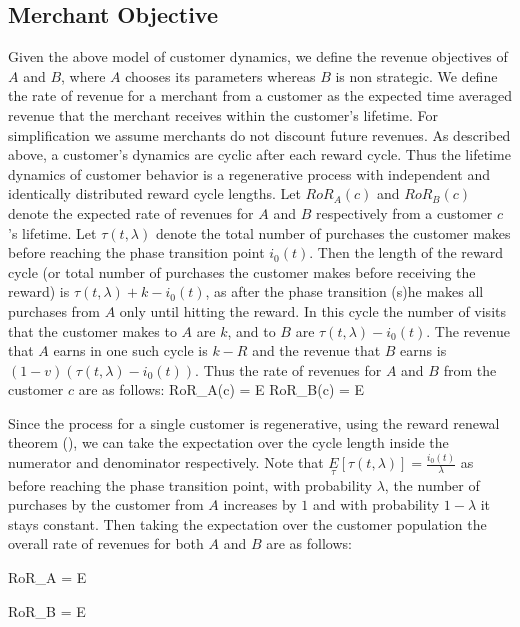 \subsection{Merchant Objective}
Given the above model of customer dynamics, we define the revenue objectives of $A$ and $B$, where $A$ chooses its parameters whereas $B$ is non strategic. 
We define the rate of revenue for a merchant from a customer as the expected time averaged revenue that the merchant receives within the customer's lifetime.
For simplification we assume merchants do not discount future revenues.
As described above, a customer's dynamics are cyclic after each reward cycle.
Thus the lifetime dynamics of customer behavior is a regenerative process with independent and identically distributed reward cycle lengths.
Let $RoR_A(c)$ and $RoR_B(c)$ denote the expected rate of revenues for $A$ and $B$ respectively from a customer $c$'s lifetime.
Let $\tau(t, \lambda)$ denote the total number of purchases the customer makes before reaching the phase transition point $i_0(t)$.
Then the length of the reward cycle (or total number of purchases the customer makes before receiving the reward) is $\tau(t, \lambda) + k - i_0(t)$, as after the phase transition (s)he makes all purchases from $A$ only until hitting the reward.
In this cycle the number of visits that the customer makes to $A$ are $k$, and to $B$ are $\tau(t,\lambda) - i_0(t)$.
The revenue that $A$ earns in one such cycle is $k-R$ and the revenue that $B$ earns is $(1-v)(\tau(t,\lambda) - i_0(t))$.
Thus the rate of revenues for $A$ and $B$ from the customer $c$ are as follows:
\beq
RoR_A(c) = \underset{\tau}E\notag
\eeq
\beq
RoR_B(c) = \underset{\tau}E\notag
\eeq

Since the process for a single customer is regenerative, using the reward renewal theorem (\cite{10.2307/1426216}), we can take the expectation over the cycle length inside the numerator and denominator respectively.
Note that $\underset{\tau}E[\tau(t,\lambda)] = \frac{i_0(t)}{\lambda}$ as before reaching the phase transition point, with probability $\lambda$, the number of purchases by the customer from $A$ increases by $1$ and with probability $1-\lambda$ it stays constant.
Then taking the expectation over the customer population the overall rate of revenues for both $A$ and $B$ are as follows:

\beq
RoR_A = E
\eeq

\beq
RoR_B = E
\eeq
